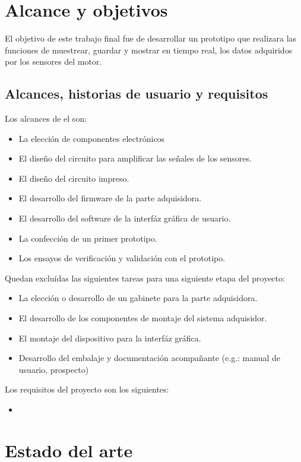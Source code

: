 \section{Alcance y objetivos}

El objetivo de este trabajo final fue de desarrollar un prototipo que realizara las funciones de muestrear, guardar y mostrar en tiempo real, los datos adquiridos por los sensores del motor.

\subsection{Alcances, historias de usuario y requisitos}

Los alcances de el son:
\begin{itemize}
\item La elección de componentes electrónicos
\item El diseño del circuito para amplificar las señales de los sensores.
\item El diseño del circuito impreso.
\item El desarrollo del firmware de la parte adquisidora.
\item El desarrollo del software de la interfáz gráfica de usuario.
\item La confección de un primer prototipo.
\item Los ensayos de verificación y validación con el prototipo.
\end{itemize}

Quedan excluídas las siguientes tareas para una siguiente etapa del proyecto:
\begin{itemize}
\item La elección o desarrollo de un gabinete para la parte adquisidora.
\item El desarrollo de los componentes de montaje del sistema adquisidor.
\item El montaje del dispositivo para la interfáz gráfica.
\item Desarrollo del embalaje y documentación acompañante (e.g.: manual de usuario, prospecto)
\end{itemize}

Los requisitos del proyecto son los siguientes:
\begin{itemize}
\item
\end{itemize}


\section{Estado del arte}

